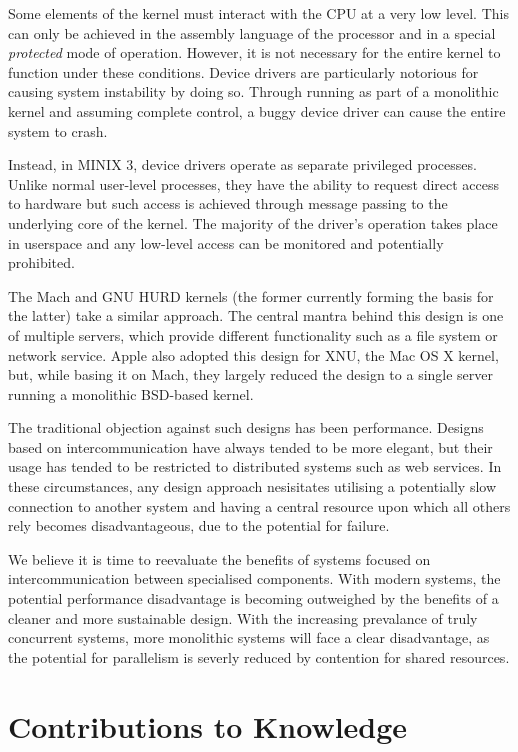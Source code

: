 Some elements of the kernel must interact with the CPU at a very low
level.  This can only be achieved in the assembly language of the
processor and in a special \emph{protected} mode of operation.
However, it is not necessary for the entire kernel to function under
these conditions.  Device drivers are particularly notorious for
causing system instability by doing so.  Through running as part of a
monolithic kernel and assuming complete control, a buggy device driver
can cause the entire system to crash.

Instead, in MINIX 3, device drivers operate as separate privileged
processes.  Unlike normal user-level processes, they have the ability
to request direct access to hardware but such access is achieved
through message passing to the underlying core of the kernel.  The
majority of the driver's operation takes place in userspace and any
low-level access can be monitored and potentially prohibited.

The Mach and GNU HURD kernels (the former currently forming the basis
for the latter) take a similar approach.  The central mantra behind
this design is one of multiple servers, which provide different
functionality such as a file system or network service.  Apple also
adopted this design for XNU, the Mac OS X kernel, but, while basing it
on Mach, they largely reduced the design to a single server running a
monolithic BSD-based kernel.

The traditional objection against such designs has been performance.
Designs based on intercommunication have always tended to be more
elegant, but their usage has tended to be restricted to distributed
systems such as web services.  In these circumstances, any design
approach nesisitates utilising a potentially slow connection to
another system and having a central resource upon which all others
rely becomes disadvantageous, due to the potential for failure.

We believe it is time to reevaluate the benefits of systems focused on
intercommunication between specialised components.  With modern
systems, the potential performance disadvantage is becoming outweighed
by the benefits of a cleaner and more sustainable design.  With the
increasing prevalance of truly concurrent systems, more monolithic
systems will face a clear disadvantage, as the potential for
parallelism is severly reduced by contention for shared resources.

\section{Contributions to Knowledge}

